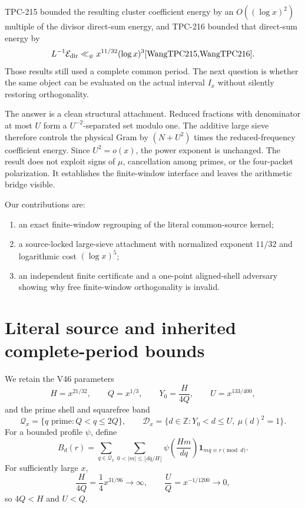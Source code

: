 \documentclass[11pt]{article}
\theoremstyle{definition}
\theoremstyle{remark}
\newcommand{\Qx}{\mathcal Q_x}
\newcommand{\Dx}{\mathcal D_x}
\newcommand{\ZZ}{\mathbb Z}
\newcommand{\one}{\mathbf 1}
\newcommand{\Edir}{\mathcal E_{\mathrm{dir}}}
\begin{document}
TPC-215 bounded the resulting cluster coefficient energy by an
$O((\log x)^2)$ multiple of the divisor direct-sum energy, and TPC-216 bounded
that direct-sum energy by
\[
 L^{-1}\Edir\ll_{\psi}x^{11/32}(\log x)^3
 \cite{WangTPC215,WangTPC216}.
\]
Those results still used a complete common period.  The next question is
whether the same object can be evaluated on the actual interval $I_x$ without
silently restoring orthogonality.

The answer is a clean structural attachment.  Reduced fractions with
denominator at most $U$ form a $U^{-2}$-separated set modulo one.  The additive
large sieve therefore controls the physical Gram by $(N+U^2)$ times the
reduced-frequency coefficient energy.  Since $U^2=o(x)$, the power exponent is
unchanged.  The result does not exploit signs of $\mu$, cancellation among
primes, or the four-packet polarization.  It establishes the finite-window
interface and leaves the arithmetic bridge visible.

Our contributions are:
\begin{enumerate}[leftmargin=2em]
  \item an exact finite-window regrouping of the literal common-source kernel;
  \item a source-locked large-sieve attachment with normalized exponent
        $11/32$ and logarithmic cost $(\log x)^5$;
  \item an independent finite certificate and a one-point aligned-shell
        adversary showing why free finite-window orthogonality is invalid.
\end{enumerate}

\section{Literal source and inherited complete-period bounds}

We retain the V46 parameters
\begin{equation}
 H=x^{21/32},\qquad Q=x^{1/3},\qquad
 Y_0=\frac{H}{4Q},\qquad U=x^{133/400},
 \label{eq:scales}
\end{equation}
and the prime shell and squarefree band
\begin{equation}
 \Qx=\{q\text{ prime}:Q<q\le2Q\},\qquad
 \Dx=\{d\in\ZZ:Y_0<d\le U,\ \mu(d)^2=1\}.
 \label{eq:band}
\end{equation}
For a bounded profile $\psi$, define
\begin{equation}
 B_d(r)=\sum_{q\in\Qx}\sum_{0<|m|\le\lfloor dq/H\rfloor}
 \psi\!\left(\frac{Hm}{dq}\right)
 \one_{m\overline q\equiv r\pmod d}.
 \label{eq:emitter}
\end{equation}
For sufficiently large $x$,
\begin{equation}
 \frac{H}{4Q}=\frac14x^{31/96}\to\infty,
 \qquad \frac{U}{Q}=x^{-1/1200}\to0,
 \label{eq:source}
\end{equation}
so $4Q<H$ and $U<Q$.
\end{document}
